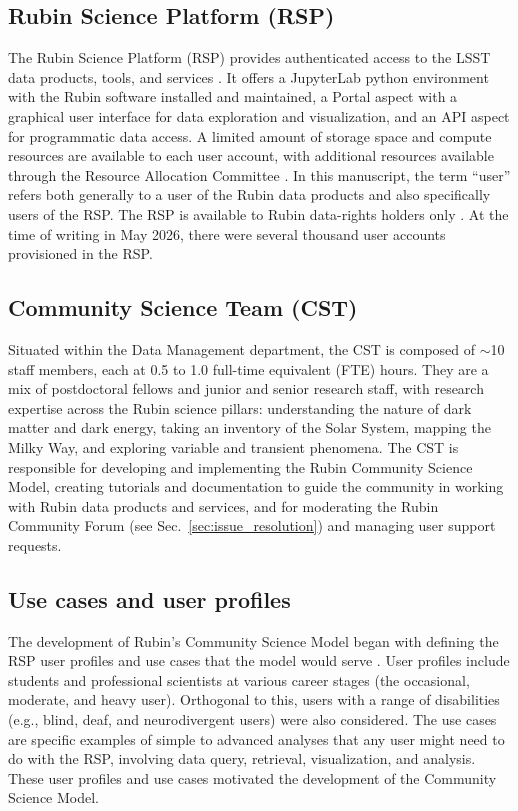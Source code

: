 \subsection{Rubin Science Platform (RSP)}

The Rubin Science Platform (RSP) provides authenticated access to the LSST data products, tools, and services \cite{LSE-319, LDM-542, 2024ASPC..535..227O}.
It offers a JupyterLab python environment with the Rubin software installed and maintained, a Portal aspect with a graphical user interface for data exploration and visualization, and an API aspect for programmatic data access.
A limited amount of storage space and compute resources are available to each user account, with additional resources available through the Resource Allocation Committee \cite{RTN-084}.
In this manuscript, the term ``user'' refers both generally to a user of the Rubin data products and also specifically users of the RSP.
The RSP is available to Rubin data-rights holders only \cite{RDO-013}.
At the time of writing in May 2026, there were several thousand user accounts provisioned in the RSP.

\subsection{Community Science Team (CST)}

Situated within the Data Management department, the CST is composed of $\sim$10 staff members, each at 0.5 to 1.0 full-time equivalent (FTE) hours.
They are a mix of postdoctoral fellows and junior and senior research staff, with research expertise across the Rubin science pillars: understanding the nature of dark matter and dark energy, taking an inventory of the Solar System, mapping the Milky Way, and exploring variable and transient phenomena.
The CST is responsible for developing and implementing the Rubin Community Science Model, creating tutorials and documentation to guide the community in working with Rubin data products and services, and for moderating the Rubin Community Forum (see Sec.~\ref{sec:issue_resolution}) and managing user support requests.

\subsection{Use cases and user profiles}

The development of Rubin's Community Science Model began with defining the RSP user profiles and use cases that the model would serve \cite{RTN-002}.
User profiles include students and professional scientists at various career stages (the occasional, moderate, and heavy user).
Orthogonal to this, users with a range of disabilities (e.g., blind, deaf, and neurodivergent users) were also considered.
The use cases are specific examples of simple to advanced analyses that any user might need to do with the RSP, involving data query, retrieval, visualization, and analysis.
These user profiles and use cases motivated the development of the Community Science Model.


